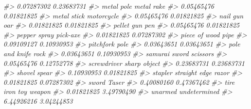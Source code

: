 \documentclass[
  12pt,
]{book}
\newenvironment{Shaded}{\begin{snugshade}}{\end{snugshade}}
\newcommand{\CommentTok}[1]{\textcolor[rgb]{0.37,0.37,0.37}{\textit{#1}}}
\begin{document}
\begin{Shaded}
\begin{Highlighting}[]
\CommentTok{\#>                       0.07287302                       0.23683731 }
\CommentTok{\#>                       metal pole                       metal rake }
\CommentTok{\#>                       0.05465476                       0.01821825 }
\CommentTok{\#>                      metal stick                       motorcycle }
\CommentTok{\#>                       0.05465476                       0.01821825 }
\CommentTok{\#>                         nail gun                              oar }
\CommentTok{\#>                       0.01821825                       0.01821825 }
\CommentTok{\#>                       pellet gun                              pen }
\CommentTok{\#>                       0.05465476                       0.01821825 }
\CommentTok{\#>                     pepper spray                         pick{-}axe }
\CommentTok{\#>                       0.01821825                       0.07287302 }
\CommentTok{\#>                    piece of wood                             pipe }
\CommentTok{\#>                       0.09109127                       0.10930953 }
\CommentTok{\#>                        pitchfork                             pole }
\CommentTok{\#>                       0.03643651                       0.03643651 }
\CommentTok{\#>                   pole and knife                             rock }
\CommentTok{\#>                       0.03643651                       0.10930953 }
\CommentTok{\#>                    samurai sword                         scissors }
\CommentTok{\#>                       0.05465476                       0.12752778 }
\CommentTok{\#>                      screwdriver                     sharp object }
\CommentTok{\#>                       0.23683731                       0.23683731 }
\CommentTok{\#>                           shovel                            spear }
\CommentTok{\#>                       0.10930953                       0.01821825 }
\CommentTok{\#>                          stapler              straight edge razor }
\CommentTok{\#>                       0.01821825                       0.07287302 }
\CommentTok{\#>                            sword                            Taser }
\CommentTok{\#>                       0.40080160                       0.47367462 }
\CommentTok{\#>                        tire iron                       toy weapon }
\CommentTok{\#>                       0.01821825                       3.49790490 }
\CommentTok{\#>                          unarmed                     undetermined }
\CommentTok{\#>                       6.44926216                       3.04244853 }

\end{Highlighting}
\end{Shaded}
\end{document}
